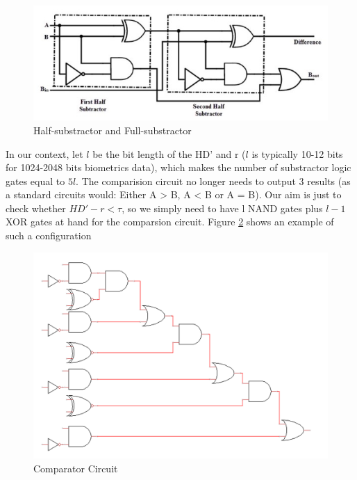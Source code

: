 \begin{figure}[htbp!] 
  \centering    
  \includegraphics[width=1.0\textwidth]{Chapter7/Figs/Raster/fullSubstractor}
  \caption{Half-substractor and Full-substractor}
  \label{fig:fullSubstractor}
\end{figure}

In our context, let \(l\) be the bit length of the HD' and r (\(l\) is typically
10-12 bits for 1024-2048 bits biometrics data), which makes the number of
substractor logic gates equal to \(5l\). The comparision circuit no longer needs
to output 3 results (as a standard circuits would: Either A > B, A < B or A =
B). Our aim is just to check whether \(HD' - r < \tau\), so we simply need to
have l NAND gates plus \(l-1\) XOR gates at hand for the comparsion
circuit. Figure \ref{fig:comparisionCircuit1} shows an example of such a
configuration
\begin{figure}[htbp!] 
  \centering    
  \includegraphics[scale=0.75]{Chapter7/Figs/Raster/comparisionCircuit}
  \caption{Comparator Circuit}
  \label{fig:comparisionCircuit1}
\end{figure}

